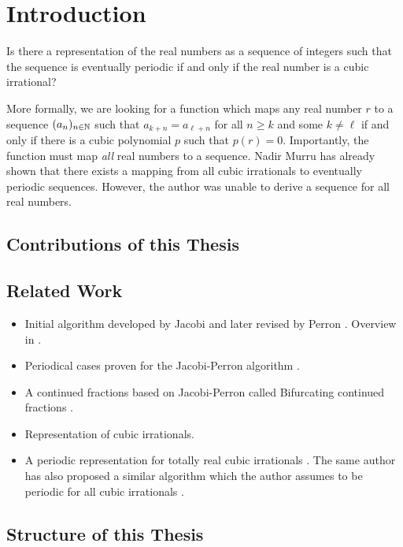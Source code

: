 \chapter{Introduction}

\begin{problem}
  Is there a representation of the real numbers as a sequence of integers such
  that the sequence is eventually periodic if and only if the real number is a
  cubic irrational?
\end{problem}

More formally, we are looking for a function which maps any real number $r$ to
a sequence $(a_n)_{n \in {\mathbb N}}$ such that $a_{k+n} = a_{\ell+n}$ for all $n \ge k$ and
some $k \ne \ell$ if and only if there is a cubic polynomial $p$ such that $p(r) = 0$.
Importantly, the function must map \emph{all} real numbers to a sequence.
Nadir Murru \cite{Murru15} has already shown that there exists a mapping from all
cubic irrationals to eventually periodic sequences.
However, the author was unable to derive a sequence for all real numbers.

\section{Contributions of this Thesis}

\section{Related Work}

\begin{itemize}
  \item Initial algorithm developed by Jacobi \cite{Jacobi68} and later revised
    by Perron \cite{Perron07}. Overview in \cite{Bernstein71}.
  \item
    Periodical cases proven for the Jacobi-Perron algorithm \cite{Bernstein64}.
  \item
    A continued fractions based on Jacobi-Perron called Bifurcating continued
    fractions \cite{Gupta00}.
  \item
    Representation of cubic irrationals. \cite{Murru15}
  \item
    A periodic representation for totally real cubic irrationals \cite{Karpenkov24}.
    The same author has also proposed a similar algorithm which the author
    assumes to be periodic for all cubic irrationals \cite{Karpenkov21}.
\end{itemize}

\section{Structure of this Thesis}
